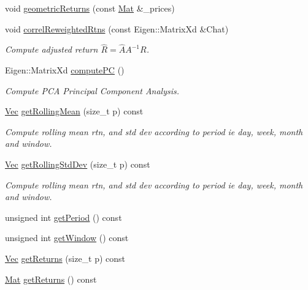 \begin{DoxyCompactItemize}
\item 
void \hyperlink{classComputeReturn_a2d55b2a2037f25e9a7a617af91b56272}{geometric\+Returns} (const \hyperlink{compute__returns__eigen_8h_ae14dd28696f743e067dbd2594616bad6}{Mat} \&\+\_\+prices)
\item 
void \hyperlink{classComputeReturn_a4d0b2d72a0fab11c03eb3e09f089a4b9}{correl\+Reweighted\+Rtns} (const Eigen\+::\+Matrix\+Xd \&Chat)
\begin{DoxyCompactList}\small\item\em Compute adjusted return $ \hat{R}= \hat{A} A^{-1} R$. \end{DoxyCompactList}\item 
Eigen\+::\+Matrix\+Xd \hyperlink{classComputeReturn_aef7572244a63c71bc4da1467cea38da2}{compute\+PC} ()
\begin{DoxyCompactList}\small\item\em Compute P\+CA Principal Component Analysis. \end{DoxyCompactList}\item 
\hyperlink{compute__returns__eigen_8h_a1eb6a9306ef406d7975f3cbf2e247777}{Vec} \hyperlink{classComputeReturn_a9e5d3161d117ea54508c5b4847bec4c2}{get\+Rolling\+Mean} (size\+\_\+t p) const
\begin{DoxyCompactList}\small\item\em Compute rolling mean rtn, and std dev according to period ie day, week, month and window. \end{DoxyCompactList}\item 
\hyperlink{compute__returns__eigen_8h_a1eb6a9306ef406d7975f3cbf2e247777}{Vec} \hyperlink{classComputeReturn_a3da2b36268c86dd0ea45439c7a2aa6f2}{get\+Rolling\+Std\+Dev} (size\+\_\+t p) const
\begin{DoxyCompactList}\small\item\em Compute rolling mean rtn, and std dev according to period ie day, week, month and window. \end{DoxyCompactList}\item 
unsigned int \hyperlink{classComputeReturn_a5a47d689a1f989932511663b6ec59aa6}{get\+Period} () const
\item 
unsigned int \hyperlink{classComputeReturn_a8b65977d4a7f929db92cf33c05428707}{get\+Window} () const
\item 
\hyperlink{compute__returns__eigen_8h_a1eb6a9306ef406d7975f3cbf2e247777}{Vec} \hyperlink{classComputeReturn_a9876c0984f83ab96da90e883270171bb}{get\+Returns} (size\+\_\+t p) const
\item 
\hyperlink{compute__returns__eigen_8h_ae14dd28696f743e067dbd2594616bad6}{Mat} \hyperlink{classComputeReturn_aa5389b3d2e175250e3569c996b5c7f00}{get\+Returns} () const

\end{DoxyCompactItemize}
